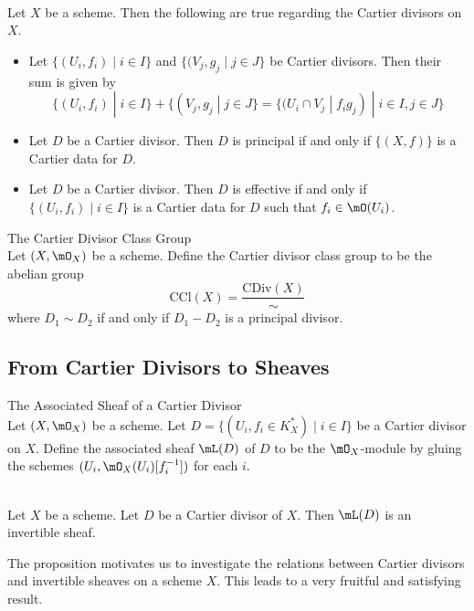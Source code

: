 \documentclass[a4paper]{article}
\begin{document}
\begin{lmm}{}{}\\
Let $X$ be a scheme. Then the following are true regarding the Cartier divisors on $X$. 
\begin{itemize}
\item Let $\{(U_i,f_i)\;|\;i\in I\}$ and $\{(V_j,g_j\;|\;j\in J\}$ be Cartier divisors. Then their sum is given by $$\{(U_i,f_i)\;|\;i\in I\}+\{(V_j,g_j\;|\;j\in J\}=\{(U_i\cap V_j\;|\;f_ig_j)\;|\;i\in I,j\in J\}$$
\item Let $D$ be a Cartier divisor. Then $D$ is principal if and only if $\{(X,f)\}$ is a Cartier data for $D$. 
\item Let $D$ be a Cartier divisor. Then $D$ is effective if and only if $\{(U_i,f_i)\;|\;i\in I\}$ is a Cartier data for $D$ such that $f_i\in\mO(U_i)$. 
\end{itemize}
\end{lmm}

\begin{defn}{The Cartier Divisor Class Group}{}\\
Let $(X,\mO_X)$ be a scheme. Define the Cartier divisor class group to be the abelian group $$\text{CCl}(X)=\frac{\text{CDiv}(X)}{\sim}$$ where $D_1\sim D_2$ if and only if $D_1-D_2$ is a principal divisor. 
\end{defn}

\subsection{From Cartier Divisors to Sheaves}
\begin{defn}{The Associated Sheaf of a Cartier Divisor}{}\\
Let $(X,\mO_X)$ be a scheme. Let $D=\{(U_i,f_i\in K_X^\ast)\;|\;i\in I\}$ be a Cartier divisor on $X$. Define the associated sheaf $\mL(D)$ of $D$ to be the $\mO_X$-module by gluing the schemes $(U_i,\mO_X(U_i)[f_i^{-1}])$ for each $i$. 
\end{defn}

\begin{prp}{}{}\\
Let $X$ be a scheme. Let $D$ be a Cartier divisor of $X$. Then $\mL(D)$ is an invertible sheaf. 
\end{prp}

The proposition motivates us to investigate the relations between Cartier divisors and invertible sheaves on a scheme $X$. This leads to a very fruitful and satisfying result. 
\end{document}
